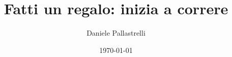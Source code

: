 \newcommand{\progressiontablenew}{
    \begin{tcolorbox}[
        enhanced,
        width=0.96\linewidth,
        colback=white,
        colframe=RunBrandDark,
        boxrule=0.9pt,
        arc=2mm,
        left=1.2mm,
        right=1.2mm,
        top=1.2mm,
        bottom=1.2mm
    ]
    {\sffamily\bfseries\color{RunBrandDark} Progressione orientativa · 10 settimane}\par\vspace{0.45em}
    \footnotesize
    \setlength{\tabcolsep}{5pt}
    \renewcommand{\arraystretch}{1.24}
    \rowcolors{2}{RunSoft}{RunBrand!5}
    \begin{tabular}{>{\centering\arraybackslash}p{0.15\linewidth} >{\centering\arraybackslash}p{0.22\linewidth} >{\raggedright\arraybackslash}p{0.47\linewidth}}
    \rowcolor{RunBrandDark}
    \textcolor{white}{\sffamily\bfseries Sett.} & \textcolor{white}{\sffamily\bfseries Fase} & \textcolor{white}{\sffamily\bfseries Allenamento} \\
    \weekbadge{1}  & \focusbadge{Avvio}      & 10 volte: 5' \walkword{} + 1' \runword{} \\
    \weekbadge{2}  & \focusbadge{Ritmo}      & 10 volte: 4' \walkword{} + 2' \runword{} \\
    \weekbadge{3}  & \focusbadge{Equilibrio} & 10 volte: 3' \walkword{} + 3' \runword{} \\
    \weekbadge{4}  & \focusbadge{Svolta}     & 6 volte: 5' \walkword{} + 5' \runword{} \\
    \weekbadge{5}  & \focusbadge{Base}       & 3 volte: 10' \walkword{} + 10' \runword{} \\
    \weekbadge{6}  & \focusbadge{Tenuta}     & 2 volte: 10' \walkword{} + 20' \runword{} \\
    \weekbadge{7}  & \focusbadge{Continuità} & 5' \walkword{} + 25' \runword{} \\
    \weekbadge{8}  & \focusbadge{Autonomia}  & 5' \walkword{} + 35' \runword{} \\
    \weekbadge{9}  & \focusbadge{Fiducia}    & 5' \walkword{} + 45' \runword{} \\
    \weekbadge{10} & \focusbadge{Traguardo}  & 1 ora di \runword{} \\
    \end{tabular}
    \end{tcolorbox}
}

\newcommand{\renderprogressiontable}{
    \ifdefstring{\progressiontablevariant}{precedente}{
        \progressiontableprevious
    }{
        \ifdefstring{\progressiontablevariant}{nuova}{
            \progressiontablenew
        }{
            \progressiontablecurrent
        }
    }
}

\title{Fatti un regalo: inizia a correre}
\author{Daniele Pallastrelli} 
\date{\today} 

